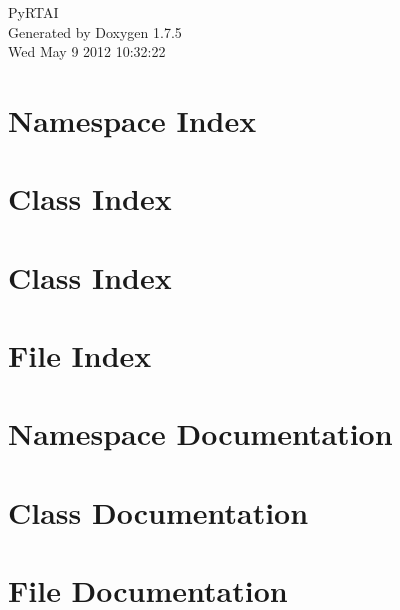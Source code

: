 \documentclass[a4paper]{book}
\begin{document}
\hypersetup{pageanchor=false,citecolor=blue}
\begin{titlepage}
\vspace*{7cm}
\begin{center}
{\Large \-Py\-R\-T\-A\-I }\\
\vspace*{1cm}
{\large \-Generated by Doxygen 1.7.5}\\
\vspace*{0.5cm}
{\small Wed May 9 2012 10:32:22}\\
\end{center}
\end{titlepage}
\clearemptydoublepage
{}
\tableofcontents
\clearemptydoublepage
{}
\hypersetup{pageanchor=true,citecolor=blue}
\chapter{\-Namespace \-Index}

\chapter{\-Class \-Index}

\chapter{\-Class \-Index}

\chapter{\-File \-Index}

\chapter{\-Namespace \-Documentation}










\chapter{\-Class \-Documentation}









\chapter{\-File \-Documentation}









\printindex
\end{document}
